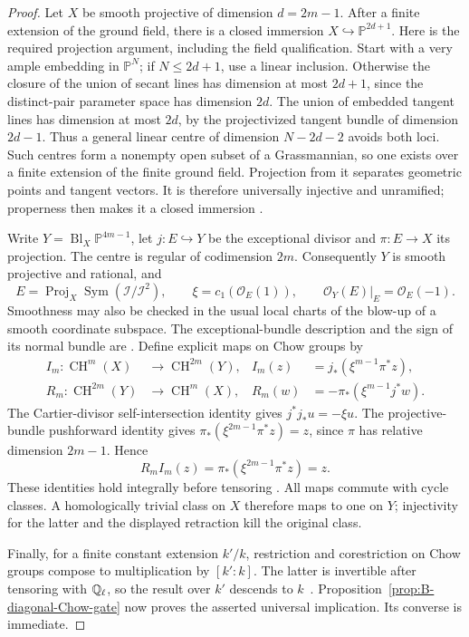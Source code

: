 \begin{proof}
Let \(X\) be smooth projective of dimension \(d=2m-1\).
After a finite extension of the ground field, there is a closed
immersion \(X\hookrightarrow\mathbb P^{2d+1}\).
Here is the required projection argument, including the field
qualification.  Start with a very ample embedding in
\(\mathbb P^N\); if \(N\le2d+1\), use a linear inclusion.
Otherwise the closure of the union of secant lines has dimension
at most \(2d+1\), since the distinct-pair parameter space has
dimension \(2d\).  The union of embedded tangent lines has
dimension at most \(2d\), by the projectivized tangent bundle
of dimension \(2d-1\).  Thus a general linear centre of
dimension \(N-2d-2\) avoids both loci.  Such centres form a
nonempty open subset of a Grassmannian, so one exists over a
finite extension of the finite ground field.  Projection from
it separates geometric points and tangent vectors.  It is
therefore universally injective and unramified; properness then
makes it a closed immersion
\cite[Lemma~41.7.2]{BStacksBlowupTests}.

Write \(Y=\operatorname{Bl}_X\mathbb P^{4m-1}\), let
\(j:E\hookrightarrow Y\) be the exceptional divisor and
\(\pi:E\to X\) its projection.  The centre is regular of
codimension \(2m\).  Consequently \(Y\) is smooth
projective and rational, and
\[
 E=\operatorname{Proj}_X\operatorname{Sym}
                  (\mathcal I/\mathcal I^2),\qquad
 \xi=c_1(\mathcal O_E(1)),\qquad
 \mathcal O_Y(E)|_E=\mathcal O_E(-1).
\]
Smoothness may also be checked in the usual local charts of the
blow-up of a smooth coordinate subspace.  The exceptional-bundle
description and the sign of its normal bundle are
\cite[Lemmas~31.33.4 and 42.59.11]{BStacksBlowupTests}.
Define explicit maps on Chow groups by
\[
 \begin{aligned}
 I_m:\operatorname{CH}^m(X)&\longrightarrow
                   \operatorname{CH}^{2m}(Y),
 &I_m(z)&=j_*(\xi^{m-1}\pi^*z),\\
 R_m:\operatorname{CH}^{2m}(Y)&\longrightarrow
                   \operatorname{CH}^{m}(X),
 &R_m(w)&=-\pi_*(\xi^{m-1}j^*w).
 \end{aligned}
\]
The Cartier-divisor self-intersection identity gives
\(j^*j_*u=-\xi u\).  The projective-bundle pushforward
identity gives \(\pi_*(\xi^{2m-1}\pi^*z)=z\), since
\(\pi\) has relative dimension \(2m-1\).  Hence
\[
 R_m I_m(z)=\pi_*(\xi^{2m-1}\pi^*z)=z.
\]
These identities hold integrally before tensoring
\cite[Lemmas~42.30.3 and 42.36.1]{BStacksBlowupTests}.
All maps commute with cycle classes.  A homologically trivial
class on \(X\) therefore maps to one on \(Y\); injectivity
for the latter and the displayed retraction kill the original
class.

Finally, for a finite constant extension \(k'/k\), restriction
and corestriction on Chow groups compose to multiplication by
\([k':k]\).  The latter is invertible after tensoring with
\(\mathbb Q_\ell\), so the result over \(k'\) descends to
\(k\)~\cite[Lemma~42.15.2]{BStacksBlowupTests}.
Proposition~\ref{prop:B-diagonal-Chow-gate} now proves the
asserted universal implication.  Its converse is immediate.
\end{proof}

